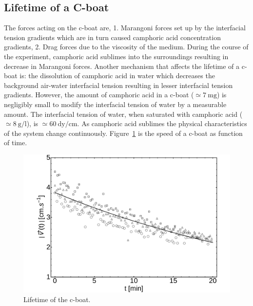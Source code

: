 \documentclass[aps, twocolumn, floatfix, superscriptaddress]{revtex4}
\begin{document}
\subsection{Lifetime of a C-boat}
\label{sec:lifetime}
The forces acting on the c-boat are, 1. Marangoni forces set up by the interfacial tension gradients which are in turn caused camphoric acid concentration gradients, 2. Drag forces due to the viscosity of the medium. During the course of the experiment, camphoric acid sublimes into the surroundings resulting in decrease in Marangoni forces. Another mechanism that affects the lifetime of a c-boat is: the dissolution of camphoric acid in water which decreases the background air-water interfacial tension resulting in lesser interfacial tension gradients. However, the amount of camphoric acid in a c-boat ($\simeq 7\ \mathrm{mg}$) is negligibly small to modify the interfacial tension of water by a measurable amount. The interfacial tension of water, when saturated with camphoric acid ($\simeq 8\ \mathrm{g/l}$), is $\simeq 60\ \mathrm{dy/cm}$. As camphoric acid sublimes the physical characteristics of the system change continuously. Figure~\ref{fig:lifetime} is the speed of a c-boat as function of time. 
\begin{figure}[ht]
    \begin{center}
       \includegraphics[scale=0.25]{figure6.pdf}
    \end{center}
    \caption{Lifetime of the c-boat.}
    \label{fig:lifetime}
\end{figure}
\end{document}
